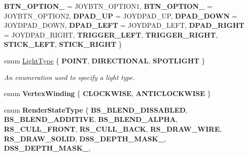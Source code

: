 \begin{DoxyCompactItemize}
\newline
{\bfseries B\+T\+N\+\_\+\+O\+P\+T\+I\+O\+N\+\_} = J\+O\+Y\+B\+T\+N\+\_\+\+O\+P\+T\+I\+O\+N1, 
{\bfseries B\+T\+N\+\_\+\+O\+P\+T\+I\+O\+N\+\_} = J\+O\+Y\+B\+T\+N\+\_\+\+O\+P\+T\+I\+O\+N2, 
{\bfseries D\+P\+A\+D\+\_\+\+UP} = J\+O\+Y\+D\+P\+A\+D\+\_\+\+UP, 
{\bfseries D\+P\+A\+D\+\_\+\+D\+O\+WN} = J\+O\+Y\+D\+P\+A\+D\+\_\+\+D\+O\+WN, 
\newline
{\bfseries D\+P\+A\+D\+\_\+\+L\+E\+FT} = J\+O\+Y\+D\+P\+A\+D\+\_\+\+L\+E\+FT, 
{\bfseries D\+P\+A\+D\+\_\+\+R\+I\+G\+HT} = J\+O\+Y\+D\+P\+A\+D\+\_\+\+R\+I\+G\+HT, 
{\bfseries T\+R\+I\+G\+G\+E\+R\+\_\+\+L\+E\+FT}, 
{\bfseries T\+R\+I\+G\+G\+E\+R\+\_\+\+R\+I\+G\+HT}, 
\newline
{\bfseries S\+T\+I\+C\+K\+\_\+\+L\+E\+FT}, 
{\bfseries S\+T\+I\+C\+K\+\_\+\+R\+I\+G\+HT}
 \}
\item 
\mbox{\label{namespace_blade_ab0c52aa137a4f43360f7440da56e6b03}} 
enum \hyperlink{namespace_blade_ab0c52aa137a4f43360f7440da56e6b03}{Light\+Type} \{ {\bfseries P\+O\+I\+NT}, 
{\bfseries D\+I\+R\+E\+C\+T\+I\+O\+N\+AL}, 
{\bfseries S\+P\+O\+T\+L\+I\+G\+HT}
 \}\begin{DoxyCompactList}\small\item\em An enumeration used to specify a light type. \end{DoxyCompactList}
\item 
\mbox{\label{namespace_blade_a4b6ac7802a4412b5138fa77c1e0533e9}} 
enum {\bfseries Vertex\+Winding} \{ {\bfseries C\+L\+O\+C\+K\+W\+I\+SE}, 
{\bfseries A\+N\+T\+I\+C\+L\+O\+C\+K\+W\+I\+SE}
 \}
\item 
\mbox{\label{namespace_blade_ac5f389178b43481cf98bcb4e6740c2c8}} 
enum {\bfseries Render\+State\+Type} \{ \newline
{\bfseries B\+S\+\_\+\+B\+L\+E\+N\+D\+\_\+\+D\+I\+S\+S\+A\+B\+L\+ED}, 
{\bfseries B\+S\+\_\+\+B\+L\+E\+N\+D\+\_\+\+A\+D\+D\+I\+T\+I\+VE}, 
{\bfseries B\+S\+\_\+\+B\+L\+E\+N\+D\+\_\+\+A\+L\+P\+HA}, 
{\bfseries R\+S\+\_\+\+C\+U\+L\+L\+\_\+\+F\+R\+O\+NT}, 
\newline
{\bfseries R\+S\+\_\+\+C\+U\+L\+L\+\_\+\+B\+A\+CK}, 
{\bfseries R\+S\+\_\+\+D\+R\+A\+W\+\_\+\+W\+I\+RE}, 
{\bfseries R\+S\+\_\+\+D\+R\+A\+W\+\_\+\+S\+O\+L\+ID}, 
{\bfseries D\+S\+S\+\_\+\+D\+E\+P\+T\+H\+\_\+\+M\+A\+S\+K\+\_}, 
\newline
{\bfseries D\+S\+S\+\_\+\+D\+E\+P\+T\+H\+\_\+\+M\+A\+S\+K\+\_}, 

\end{DoxyCompactItemize}
